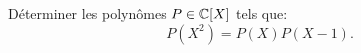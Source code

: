 \begin{exercice}
    Déterminer les polynômes $P \in \mathbb{C}[X]$ tels que:
    $$P(X^2) = P(X) P(X-1).$$
\end{exercice}